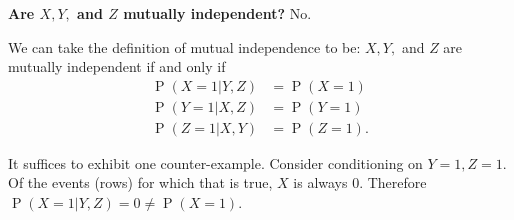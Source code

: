 \documentclass{article}
\DeclareMathOperator{\p}{\text{P}}
\begin{document}
\begin{enumerate}[label=(\alph*)]
    \begin{mdframed}
      \textbf{Are $X, Y,$ and $Z$ mutually independent?} No.

      We can take the definition of mutual independence to be: $X, Y,$ and $Z$
      are mutually independent if and only if
      \begin{align*}
        \p(X=1|Y,Z) &= \p(X=1)\\
        \p(Y=1|X,Z) &= \p(Y=1)\\
        \p(Z=1|X,Y) &= \p(Z=1).
      \end{align*}

      It suffices to exhibit one counter-example. Consider conditioning on
      $Y=1,Z=1$. Of the events (rows) for which that is true, $X$ is always
      0. Therefore $\p(X=1|Y,Z) = 0 \neq \p(X=1)$.

    \end{mdframed}

\end{enumerate}

\newpage
\end{document}

